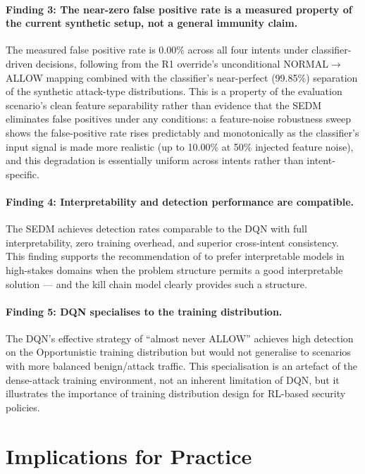\paragraph{Finding 3: The near-zero false positive rate is a measured property of the current synthetic setup, not a general immunity claim.}
The measured false positive rate is 0.00\% across all four intents under
classifier-driven decisions, following from the R1 override's unconditional
NORMAL$\to$ALLOW mapping combined with the classifier's near-perfect
(99.85\%) separation of the synthetic attack-type distributions.
This is a property of the evaluation scenario's clean feature separability
rather than evidence that the SEDM eliminates false positives under any
conditions: a feature-noise robustness sweep shows the false-positive rate
rises predictably and monotonically as the classifier's input signal is made
more realistic (up to 10.00\% at 50\% injected feature noise), and this
degradation is essentially uniform across intents rather than
intent-specific.

\paragraph{Finding 4: Interpretability and detection performance are compatible.}
The SEDM achieves detection rates comparable to the DQN with full
interpretability, zero training overhead, and superior cross-intent
consistency.
This finding supports the recommendation of \citet{rudin2019stop} to prefer
interpretable models in high-stakes domains when the problem structure permits
a good interpretable solution --- and the kill chain model clearly provides
such a structure.

\paragraph{Finding 5: DQN specialises to the training distribution.}
The DQN's effective strategy of ``almost never ALLOW'' achieves high
detection on the Opportunistic training distribution but would not generalise
to scenarios with more balanced benign/attack traffic.
This specialisation is an artefact of the dense-attack training environment,
not an inherent limitation of DQN, but it illustrates the importance of
training distribution design for RL-based security policies.

\section{Implications for Practice}

